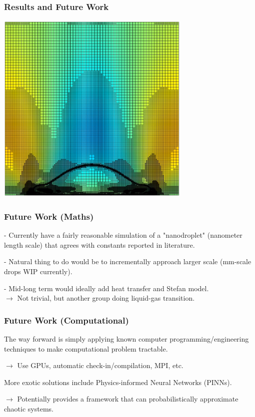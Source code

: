 \documentclass[12pt]{beamer}
\begin{document}
\begin{frame}
    \frametitle{Results and Future Work}
    \includegraphics[width=0.7\textwidth]{img/7-current.png}
\end{frame}
\begin{frame}
    \frametitle{Future Work (Maths)}
    - Currently have a fairly reasonable simulation of a "nanodroplet" (nanometer length scale) that agrees with constants reported in literature.

    - Natural thing to do would be to incrementally approach larger scale 
    (mm-scale drops WIP currently).

    - Mid-long term would ideally add heat transfer and Stefan model. \\
    $\rightarrow$ Not trivial, but another group doing liquid-gas transition.
\end{frame}
\begin{frame}
    \frametitle{Future Work (Computational)}
    The way forward is simply applying known computer 
    programming/engineering techniques to make computational problem tractable.

    $\rightarrow$ Use GPUs, automatic check-in/compilation, MPI, etc.

    More exotic solutions include Physics-informed Neural Networks (PINNs).

    $\rightarrow$ Potentially provides a framework that can probabilistically 
    approximate chaotic systems.
\end{frame}
\end{document}
